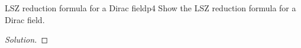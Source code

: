 \begin{problem}{LSZ reduction formula for a Dirac field}{p4}
   Show the LSZ reduction formula for a Dirac field.
\end{problem}
\begin{proof}[Solution]
    
\end{proof}
